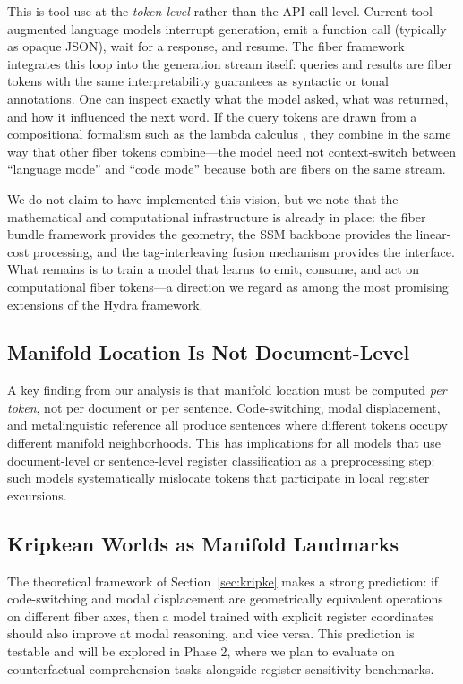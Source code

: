 \documentclass[11pt]{article}
\begin{document}
This is tool use at the \emph{token level} rather than the API-call 
level. Current tool-augmented language models interrupt generation, emit 
a function call (typically as opaque JSON), wait for a response, and 
resume. The fiber framework integrates this loop into the generation 
stream itself: queries and results are fiber tokens with the same 
interpretability guarantees as syntactic or tonal annotations. One can 
inspect exactly what the model asked, what was returned, and how it 
influenced the next word. If the query tokens are drawn from a 
compositional formalism such as the lambda calculus 
\citep{montague1973proper}, they combine in the same way that other 
fiber tokens combine---the model need not context-switch between 
``language mode'' and ``code mode'' because both are fibers on the 
same stream.

We do not claim to have implemented this vision, but we note that the 
mathematical and computational infrastructure is already in place: the 
fiber bundle framework provides the geometry, the SSM backbone provides 
the linear-cost processing, and the tag-interleaving fusion mechanism 
provides the interface. What remains is to train a model that learns 
to emit, consume, and act on computational fiber tokens---a direction 
we regard as among the most promising extensions of the Hydra framework.

\subsection{Manifold Location Is Not Document-Level}

A key finding from our analysis is that manifold location must be computed 
\emph{per token}, not per document or per sentence. Code-switching, modal 
displacement, and metalinguistic reference all produce sentences where 
different tokens occupy different manifold neighborhoods. This has 
implications for all models that use document-level or sentence-level 
register classification as a preprocessing step: such models systematically 
mislocate tokens that participate in local register excursions.

\subsection{Kripkean Worlds as Manifold Landmarks}

The theoretical framework of Section~\ref{sec:kripke} makes a strong 
prediction: if code-switching and modal displacement are geometrically 
equivalent operations on different fiber axes, then a model trained with 
explicit register coordinates should also improve at modal reasoning, and 
vice versa. This prediction is testable and will be explored in Phase 2, 
where we plan to evaluate on counterfactual comprehension tasks alongside 
register-sensitivity benchmarks.
\end{document}
